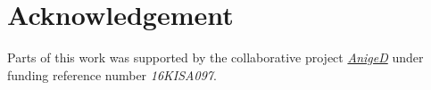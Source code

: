 \section{Acknowledgement}
Parts of this work was supported by the collaborative project \hyperlink{https://www.destatis.de/DE/Ueber-uns/AnigeD/_inhalt.html}{\textit{AnigeD}} under funding reference number \textit{16KISA097}. 



\address{Lorena Gril\\
  Freie Universität Berlin, FB Wirtschaftswissenschaft\\
  Garystr. 21, D-14195 Berlin\\
  Germany\\
  }

\address{Laura Steinkemper\\
  Freie Universität Berlin, FB Wirtschaftswissenschaft\\
  Garystr. 21, D-14195 Berlin\\
  Germany\\
    }

\address{Marcus Groß\\
  INWT Statistics GmbH\\
  Hauptstr.8, D-10827 Berlin\\
  Germany\\
  }

  \address{Ulrich Rendtel\\
  Freie Universität Berlin, FB Wirtschaftswissenschaft\\
  Garystr. 21, D-14195 Berlin\\
  Germany\\
  }





